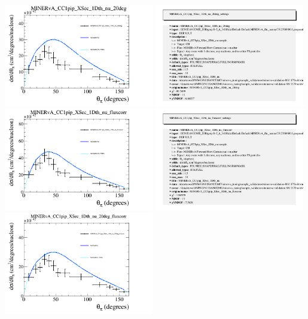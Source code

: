 \documentclass{article}
\begin{document}
\centering
\includegraphics[width=0.49\textwidth]{figures/nuisance_MINERvA_CC1pip_XSec_1Dth_nu_20deg_comp.png}
\includegraphics[width=0.49\textwidth]{figures/nuisance_MINERvA_CC1pip_XSec_1Dth_nu_20deg_info.png}
\centering
\includegraphics[width=0.49\textwidth]{figures/nuisance_MINERvA_CC1pip_XSec_1Dth_nu_fluxcorr_comp.png}
\includegraphics[width=0.49\textwidth]{figures/nuisance_MINERvA_CC1pip_XSec_1Dth_nu_fluxcorr_info.png}
\centering
\includegraphics[width=0.49\textwidth]{figures/nuisance_MINERvA_CC1pip_XSec_1Dth_nu_20deg_fluxcorr_comp.png}
\end{document}
